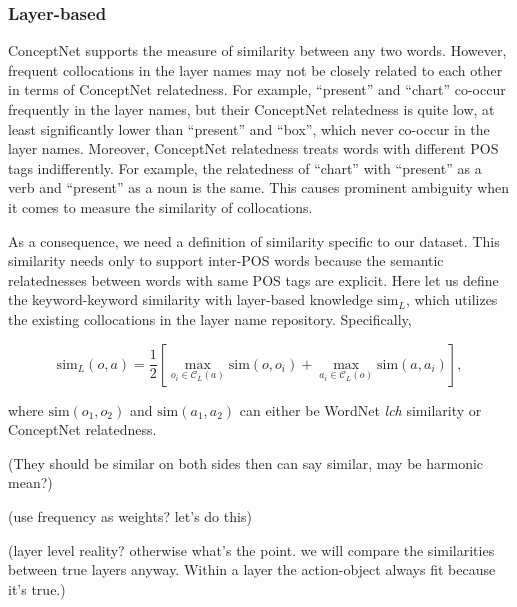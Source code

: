 \documentclass{article} %
\begin{document}
\subsubsection{Layer-based}

ConceptNet supports the measure of similarity between any two words. However, frequent collocations in the layer names may not be closely related to each other in terms of ConceptNet relatedness. For example, ``present'' and ``chart'' co-occur frequently in the layer names, but their ConceptNet relatedness is quite low, at least significantly lower than ``present'' and ``box'', which never co-occur in the layer names. Moreover, ConceptNet relatedness treats words with different POS tags indifferently. For example, the relatedness of ``chart'' with ``present'' as a verb and ``present'' as a noun is the same. This causes prominent ambiguity when it comes to measure the similarity of collocations.

As a consequence, we need a definition of similarity specific to our dataset. This similarity needs only to support inter-POS words because the semantic relatednesses between words with same POS tags are explicit. Here let us define the keyword-keyword similarity with layer-based knowledge $\mathrm{sim}_L$, which utilizes the existing collocations in the layer name repository. Specifically,

$$
\mathrm{sim}_L (o, a) =\frac{1}{2} \left[\max_{o_i\in \mathcal{C}_L(a)} \mathrm{sim} (o, o_i)+\max_{a_i\in \mathcal{C}_L(o)} \mathrm{sim} (a, a_i) \right],
$$

%	

where $\mathrm{sim}(o_1,o_2)$ and $\mathrm{sim}(a_1,a_2)$ can either be WordNet \emph{lch} similarity or ConceptNet relatedness.

(They should be similar on both sides then can say similar, may be harmonic mean?)

(use frequency as weights? let's do this)

(layer level reality? otherwise what's the point. we will compare the similarities between true layers anyway. Within a layer the action-object always fit because it's true.)
\end{document}
